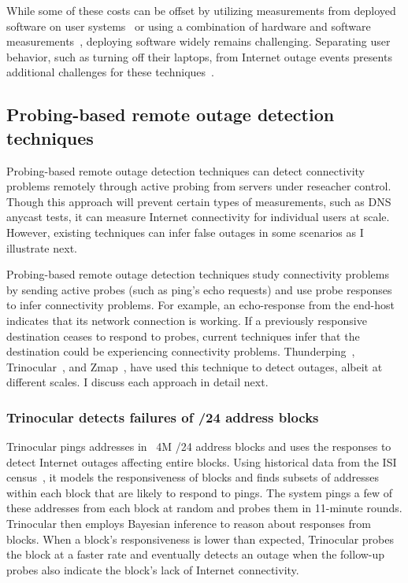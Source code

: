 While some of these costs can be offset by utilizing measurements from
deployed software on user systems~\cite{netdimes, dhcp-dimes, Dasu:NSDI2013} or using a combination of hardware
and software measurements~\cite{IMC2014-Broadband-bischof}, deploying software widely remains
challenging. Separating user behavior, such as turning off their laptops, from
Internet outage events presents additional challenges for these techniques~\cite{dhcp-dimes}.
 
\subsection{Probing-based remote outage detection techniques}


Probing-based remote outage detection techniques can detect
connectivity problems remotely through active probing from servers
under reseacher control. Though this approach will prevent 
certain types of measurements, such as DNS anycast tests, it can measure
Internet connectivity for individual users at scale. However,
existing techniques can infer false outages in some scenarios as I
illustrate next.

Probing-based remote outage detection techniques study connectivity problems by
sending active probes (such as ping's echo requests) and use probe
responses to infer connectivity problems. For example, an
echo-response from the end-host indicates that its network connection
is working. If a previously responsive destination ceases to respond
to probes, current techniques infer that the destination could be
experiencing connectivity problems. Thunderping~\cite{pingin},
Trinocular~\cite{trinocular}, and Zmap~\cite{durumeric2013zmap}, have
used this technique to detect outages, albeit at different scales. I
discuss each approach in detail next.

\subsubsection{Trinocular detects failures of /24 address blocks}

Trinocular pings addresses in ~4M /24 address blocks and
uses the responses to detect Internet outages affecting entire blocks. Using historical
data from the ISI census~\cite{census-survey}, it models the responsiveness of
blocks and finds subsets of addresses within each block that are
likely to respond to pings. The system pings a few of these addresses
from each block at random and probes them in 11-minute
rounds. Trinocular then employs Bayesian inference to reason about
responses from blocks. When a block's responsiveness is lower than
expected, Trinocular probes the block at a faster rate and eventually
detects an outage when the follow-up probes also indicate the block's
lack of Internet connectivity.

